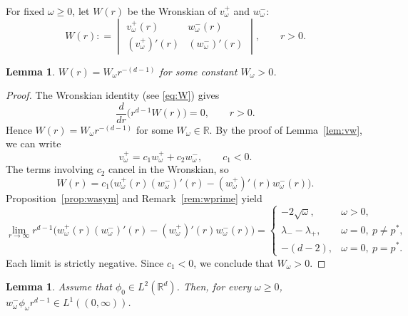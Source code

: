 \documentclass[12pt, a4paper, reqno]{amsart}
\numberwithin{equation}{section}
\newtheorem{lemma}[theorem]{Lemma}
\theoremstyle{definition}
\theoremstyle{remark}
\newcommand{\R}{\mathbb R}
\newcommand{\ce}{\mathrel{\mathop:}=}
\begin{document}
For fixed $\omega\ge0$, let $W(r)$ be the Wronskian of $v_\omega^+$ and $w_\omega^-$:
\[  W(r)
    \ce \begin{vmatrix}
    v_\omega^+(r) & w_\omega^-(r)
\\  (v_\omega^+)'(r) & (w_\omega^-)'(r)
    \end{vmatrix},\qquad
    r>0.    \]

\begin{lemma}\label{lem:Wom}
$W(r)=W_\omega r^{-(d-1)}$ for some constant $W_\omega>0$.
\end{lemma}
\begin{proof}
The Wronskian identity (see \eqref{eq:W}) gives
\[
  \frac{d}{dr}\bigl(r^{d-1}W(r)\bigr)=0,\qquad r>0.
\]
Hence $W(r)=W_\omega r^{-(d-1)}$ for some $W_\omega\in\R$.
By the proof of Lemma~\ref{lem:vw}, we can write
\[
  v_\omega^+=c_1w_\omega^++c_2w_\omega^-,\qquad c_1<0.
\]
The terms involving $c_2$ cancel in the Wronskian, so
\[
  W(r)=c_1\bigl(w_\omega^+(r)(w_\omega^-)'(r)
                 -(w_\omega^+)'(r)w_\omega^-(r)\bigr).
\]
Proposition~\ref{prop:wasym} and Remark~\ref{rem:wprime} yield
\[
  \lim_{r\to\infty}r^{d-1}
    \bigl(w_\omega^+(r)(w_\omega^-)'(r)
          -(w_\omega^+)'(r)w_\omega^-(r)\bigr)
  =\begin{cases}
    -2\sqrt{\omega}, & \omega>0,\\[2pt]
    \lambda_--\lambda_+, & \omega=0,\ p\ne p^*,\\[2pt]
    -(d-2), & \omega=0,\ p=p^*.
  \end{cases}
\]
Each limit is strictly negative. Since $c_1<0$, we conclude that
$W_\omega>0$.
\end{proof}

\begin{lemma}\label{lem:int}
Assume that $\phi_0\in L^2(\R^d)$. Then, for every $\omega\ge0$,
$w_\omega^-\phi_\omega r^{d-1}\in L^1((0,\infty))$.
\end{lemma}
\end{document}
